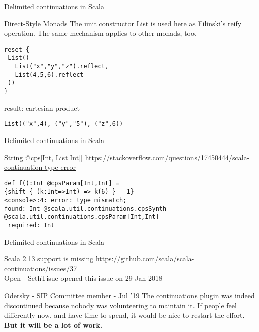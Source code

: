 \documentclass{beamer}
\begin{document}
    \begin{frame}[fragile]{Delimited continuations in Scala}
        \begin{block}{Direct-Style Monads}
            The unit constructor List is used here as Filinski’s reify operation.
            The same mechanism applies to other monads, too.
        \end{block}
        \begin{example}
            \begin{lstlisting}
reset {
 List((
   List("x","y","z").reflect,
   List(4,5,6).reflect
 ))
}
            \end{lstlisting}
            result: cartesian product
            \begin{lstlisting}
List(("x",4), ("y","5"), ("z",6))
            \end{lstlisting}
        \end{example}
    \end{frame}

    \begin{frame}[fragile]{Delimited continuations in Scala}
        \begin{center}
            \begin{block}{String @cps[Int, List[Int]]}
                \url{https://stackoverflow.com/questions/17450444/scala-continuation-type-error}
            \end{block}
            \begin{example}
                \begin{lstlisting}
def f():Int @cpsParam[Int,Int] =
{shift { (k:Int=>Int) => k(6) } - 1}
<console>:4: error: type mismatch;
found: Int @scala.util.continuations.cpsSynth
@scala.util.continuations.cpsParam[Int,Int]
 required: Int
                \end{lstlisting}
            \end{example}
        \end{center}
    \end{frame}

    \begin{frame}[fragile]{Delimited continuations in Scala}
        \begin{alertblock}{Scala 2.13 support is missing}
            https://github.com/scala/scala-continuations/issues/37 \\
            \alert{Open} - SethTisue opened this issue on 29 Jan 2018
        \end{alertblock}
        \begin{block}{Odersky - SIP Committee member - Jul '19 }
            The continuations plugin was indeed discontinued because nobody was volunteering to maintain it.
            If people feel differently now, and have time to spend, it would be nice to restart the effort.\\
            \alert{\textbf{But it will be a lot of work.}}
        \end{block}
    \end{frame}
\end{document}
